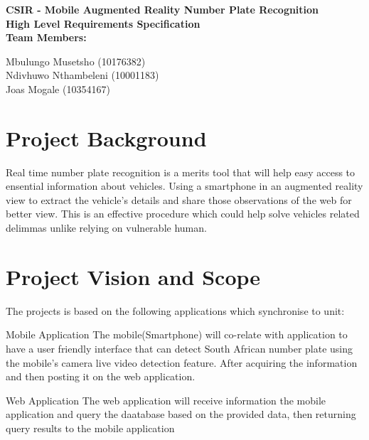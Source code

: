 \documentclass[12pt]{article}
\newcommand{\Title}{CSIR - Mobile Augmented Reality Number Plate Recognition} %
\begin{document}
        \vspace{4em}
        
        \begin{center}%
        	
		
          \LARGE \bf \Title \\[4em]
          \LARGE {\bf High Level Requirements Specification}\\[1em]
          \LARGE {\bf Team Members:}\\[2em]
          \large
          
             Mbulungo Musetsho                          (10176382) \\[1em]
             Ndivhuwo Nthambeleni (10001183)	\\[1em]
             Joas Mogale (10354167)		\\[1em]
            
        \end{center}%
        

        \newpage
        \tableofcontents    
                \newpage
                \section{Project Background}
	Real time number plate recognition is a merits tool that will help easy access to ensential information about vehicles. Using a smartphone in an augmented reality view to extract the vehicle's details and share those observations of the web for better view. This is an effective procedure which could help solve vehicles related delimmas unlike relying on vulnerable human.
                \section{Project Vision and Scope}
The projects is based on the following applications which synchronise to unit:
\item{Mobile Application}
The mobile(Smartphone) will co-relate with application to have a user friendly interface that can detect South African number plate using the mobile's camera live video detection feature. After acquiring the information and then posting it on the web application.

\item{Web Application}
The web application will receive information the mobile application and query the daatabase based on the provided data, then returning query results to the mobile application
\end{document}

